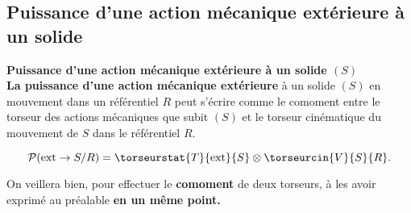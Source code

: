 %
%
%

\subsection{Puissance d'une action mécanique extérieure à un solide}
\begin{defi}\textbf{Puissance d'une action mécanique extérieure à un solide $(S)$} \\
\textbf{La puissance d'une action mécanique extérieure} à un solide $(S)$ en mouvement dans un référentiel $R$ peut s'écrire comme le comoment entre le torseur des actions mécaniques que subit $(S)$ et le torseur cinématique du mouvement de $S$ dans le référentiel $R$.

$$
\mathcal{P}(\text{ext} \rightarrow S/R)=\torseurstat{T}{\text{ext}}{S}\otimes \torseurcin{V}{S}{R}.
$$
\end{defi}



\begin{warn}
On veillera bien, pour effectuer le \textbf{comoment} de deux torseurs, à les avoir exprimé au préalable {\textbf{en un même point.}}
\end{warn}

